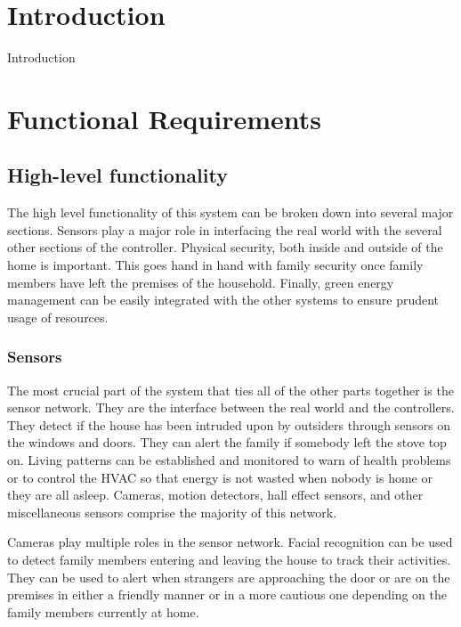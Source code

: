 \documentclass{report}
\begin{document}
\tableofcontents

\chapter{Introduction}

Introduction

\chapter{Functional Requirements}

\section{High-level functionality}
The high level functionality of this system can be broken down into several
major sections. Sensors play a major role in interfacing the real world with
the several other sections of the controller. Physical security, both inside
and outside of the home is important. This goes hand in hand with family
security once family members have left the premises of the household. Finally,
green energy management can be easily integrated with the other systems to
ensure prudent usage of resources. 

\subsection{Sensors}

The most crucial part of the system that ties all of the other parts together
is the sensor network. They are the interface between the real world and the
controllers. They detect if the house has been intruded upon by outsiders
through sensors on the windows and doors. They can alert the family if somebody
left the stove top on. Living patterns can be established and monitored to
warn of health problems or to control the HVAC so that energy is not wasted
when nobody is home or they are all asleep. Cameras, motion detectors, hall
effect sensors, and other miscellaneous sensors comprise the majority of this
network.

Cameras play multiple roles in the sensor network. Facial recognition can be
used to detect family members entering and leaving the house to track their
activities. They can be used to alert when strangers are approaching the door
or are on the premises in either a friendly manner or in a more cautious one
depending on the family members currently at home.
\end{document}
